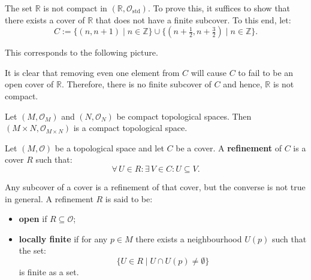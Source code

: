 \documentclass[root.tex]{subfiles}
\begin{document}
\begin{myex}
The set $\mathbb{R}$ is not compact in $(\mathbb{R},\mathcal{O}_\mathrm{std})$. To prove this, it suffices to show that there exists a cover of $\mathbb{R}$ that does not have a finite subcover. To this end, let:
$$
C := \{(n,n+1)\mid n \in \mathbb{Z}\} \cup \{(n+\tfrac{1}{2},n+\tfrac{3}{2})\mid n \in \mathbb{Z}\} .
$$

This corresponds to the following picture.

\begin{figure}[h!]
\centering
{}
\end{figure}

It is clear that removing even one element from $C$ will cause $C$ to fail to be an open cover of $\mathbb{R}$. Therefore, there is no finite subcover of $C$ and hence, $\mathbb{R}$ is not compact.
\end{myex}

\begin{theorem}
Let $(M,\mathcal{O}_M)$ and $(N,\mathcal{O}_N)$ be compact topological spaces. Then $(M\times N,\mathcal{O}_{M\times N})$ is a compact topological space.
\end{theorem}

\begin{mydef}
Let $(M,\mathcal{O})$ be a topological space and let $C$ be a cover. A \textbf{refinement} of $C$ is a cover $R$ such that:
$$
\forall \, U \in R : \exists \, V \in C : U \subseteq V .
$$
\end{mydef}
Any subcover of a cover is a refinement of that cover, but the converse is not true in general. A refinement $R$ is said to be:
\begin{itemize}
\item \textbf{open} if $R\subseteq \mathcal{O}$;
\item \textbf{locally finite} if for any $p\in M$ there exists a neighbourhood $U(p)$ such that the set:
$$
\{U \in R \mid U \cap U(p) \neq \emptyset\}
$$
is finite as a set.
\end{itemize}
\end{document}
